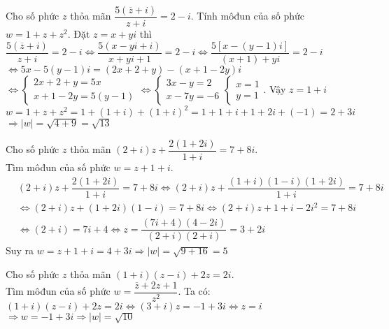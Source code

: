 \begin{bt}%
	Cho số phức $z$ thỏa mãn $\dfrac{5\left(\overline{z}+i \right)}{z+i}=2-i$. Tính môđun của số phức $w=1+z+z^2$.
	\loigiai
	{
		Đặt $z=x+yi$ thì $\dfrac{5\left(\overline{z}+i \right)}{z+i}=2-i\Leftrightarrow\dfrac{5\left( x-yi+i\right)}{x+yi+1}=2-i\Leftrightarrow\dfrac{5\left[x-\left(y-1 \right)i \right]}{\left(x+1 \right)+yi}=2-i$\\
		$\Leftrightarrow 5x-5\left(y-1 \right)i=\left(2x+2+y \right)-\left(x+1-2y \right)i$\\
		$\Leftrightarrow \begin{cases}2x+2+y=5x \\x+1-2y=5\left(y-1 \right) \end{cases}\Leftrightarrow\begin{cases}3x-y=2 \\x-7y=-6 \end{cases}\begin{cases} x=1\\y=1 \end{cases}$. Vậy $z=1+i$\\
		$w=1+z+z^2=1+\left(1+i \right)+\left(1+i \right)^2=1+1+i+1+2i+\left(-1 \right)=2+3i$\\
		$\Rightarrow \left|w \right|=\sqrt{4+9}=\sqrt{13}$	
	}
\end{bt}

\begin{bt}%
	Cho số phức $z$ thỏa mãn $\left(2+i \right)z+\dfrac{2\left(1+2i \right)}{1+i}=7+8i$.\\
	Tìm môđun của số phức $w=z+1+i$.
	\loigiai 
	{
		\begin{align*}
		&\left(2+i \right)z+\dfrac{2\left(1+2i \right)}{1+i}=7+8i\Leftrightarrow \left( 2+i\right)z+\dfrac{\left(1+i \right)\left(1-i \right)\left(1+2i \right)}{1+i}=7+8i\\
		&\Leftrightarrow\left(2+i \right)z+\left( 1+2i\right)\left(1-i \right)=7+8i\Leftrightarrow\left(2+i \right)z+1+i-2i^2=7+8i\\
		&\Leftrightarrow\left(2+i \right)=7i+4\Leftrightarrow z=\dfrac{\left(7i+4 \right)\left( 4-2i\right)}{\left(2+i \right)\left(2+i \right)}=3+2i
		\end{align*}
		Suy ra $w=z+1+i=4+3i\Rightarrow \left|w \right|=\sqrt{9+16}=5$
	}
\end{bt}

\begin{bt}%
	Cho số phức $z$ thỏa mãn $\left(1+i \right)\left(z-i \right)+2z=2i$.\\
	Tìm môđun của số phức $w=\dfrac{\overline{z}+2z+1}{z^2}$.
	\loigiai 
	{
		Ta có: $\left(1+i \right)\left(z-i \right)+2z=2i\Leftrightarrow\left( 3+i\right)z=-1+3i\Leftrightarrow z=i$\\
		$\Rightarrow w=-1+3i\Rightarrow \left|w \right|=\sqrt{10}$		
	}
\end{bt}

